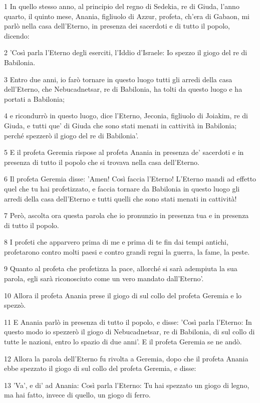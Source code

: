\par 1 In quello stesso anno, al principio del regno di Sedekia, re di Giuda, l'anno quarto, il quinto mese, Anania, figliuolo di Azzur, profeta, ch'era di Gabaon, mi parlò nella casa dell'Eterno, in presenza dei sacerdoti e di tutto il popolo, dicendo:
\par 2 'Così parla l'Eterno degli eserciti, l'Iddio d'Israele: Io spezzo il giogo del re di Babilonia.
\par 3 Entro due anni, io farò tornare in questo luogo tutti gli arredi della casa dell'Eterno, che Nebucadnetsar, re di Babilonia, ha tolti da questo luogo e ha portati a Babilonia;
\par 4 e ricondurrò in questo luogo, dice l'Eterno, Jeconia, figliuolo di Joiakim, re di Giuda, e tutti que' di Giuda che sono stati menati in cattività in Babilonia; perché spezzerò il giogo del re di Babilonia'.
\par 5 E il profeta Geremia rispose al profeta Anania in presenza de' sacerdoti e in presenza di tutto il popolo che si trovava nella casa dell'Eterno.
\par 6 Il profeta Geremia disse: 'Amen! Così faccia l'Eterno! L'Eterno mandi ad effetto quel che tu hai profetizzato, e faccia tornare da Babilonia in questo luogo gli arredi della casa dell'Eterno e tutti quelli che sono stati menati in cattività!
\par 7 Però, ascolta ora questa parola che io pronunzio in presenza tua e in presenza di tutto il popolo.
\par 8 I profeti che apparvero prima di me e prima di te fin dai tempi antichi, profetarono contro molti paesi e contro grandi regni la guerra, la fame, la peste.
\par 9 Quanto al profeta che profetizza la pace, allorché si sarà adempiuta la sua parola, egli sarà riconosciuto come un vero mandato dall'Eterno'.
\par 10 Allora il profeta Anania prese il giogo di sul collo del profeta Geremia e lo spezzò.
\par 11 E Anania parlò in presenza di tutto il popolo, e disse: 'Così parla l'Eterno: In questo modo io spezzerò il giogo di Nebucadnetsar, re di Babilonia, di sul collo di tutte le nazioni, entro lo spazio di due anni'. E il profeta Geremia se ne andò.
\par 12 Allora la parola dell'Eterno fu rivolta a Geremia, dopo che il profeta Anania ebbe spezzato il giogo di sul collo del profeta Geremia, e disse:
\par 13 'Va', e di' ad Anania: Così parla l'Eterno: Tu hai spezzato un giogo di legno, ma hai fatto, invece di quello, un giogo di ferro.
